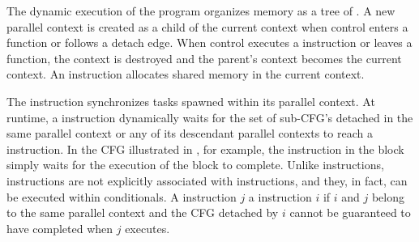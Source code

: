 
The dynamic execution of the program organizes memory as a tree of
.  A new parallel context is created as a
child of the current context when control enters a function or follows
a detach edge.  When control executes a \reattach instruction or
leaves a function, the context is destroyed and the parent's context
becomes the current context.  An  instruction allocates
shared memory in the current context.


The \sync instruction synchronizes tasks spawned within its parallel
context.  At runtime, a \sync instruction dynamically waits for the
set of sub-CFG's detached in the same parallel context or any of its
descendant parallel contexts to reach a \reattach instruction.  In the
\tapir CFG illustrated in , for example, the \sync
instruction in the  block simply waits for the execution of
the  block to complete.  Unlike \reattach instructions,
\sync instructions are not explicitly associated with \detach
instructions, and they, in fact, can be executed within conditionals.
A \sync instruction $j$  a \detach instruction $i$ if $i$
and $j$ belong to the same parallel context and the CFG detached by
$i$ cannot be guaranteed to have completed when $j$ executes.




